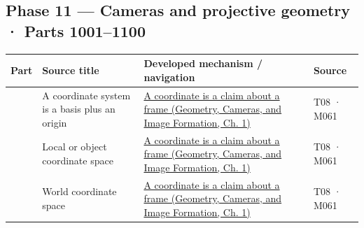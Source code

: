 \subsection{Phase 11 --- Cameras and projective geometry · Parts 1001--1100}\label{appendix-fd090d982a15-phase-11-cameras-and-projective-geometry-parts-10011100}

\hypertarget{appendix-fd090d982a15-phase-11-cameras-and-projective-geometry-parts-10011100}{}

{\def\LTcaptype{none} %
\begin{longtable}[]{@{}
  >{\raggedleft\arraybackslash}p{}
  >{\raggedright\arraybackslash}p{}
  >{\raggedright\arraybackslash}p{}
  >{\raggedright\arraybackslash}p{}@{}}
\toprule\noalign{}
\begin{minipage}[b]{\linewidth}\raggedleft
Part
\end{minipage} & \begin{minipage}[b]{\linewidth}\raggedright
Source title
\end{minipage} & \begin{minipage}[b]{\linewidth}\raggedright
Developed mechanism / navigation
\end{minipage} & \begin{minipage}[b]{\linewidth}\raggedright
Source
\end{minipage} \\
\midrule\noalign{}
\endhead
\bottomrule\noalign{}
\endlastfoot
1001 & A coordinate system is a basis plus an origin & \href{../03-Geometry-Cameras-and-Image-Formation/main.pdf\#nameddest=02-foundations-ii-ch032-a-coordinate-is-a-claim-about-a-frame}{A coordinate is a claim about a frame (Geometry, Cameras, and Image Formation, Ch. 1)} & T08 · M061 \\
1002 & Local or object coordinate space & \href{../03-Geometry-Cameras-and-Image-Formation/main.pdf\#nameddest=02-foundations-ii-ch032-a-coordinate-is-a-claim-about-a-frame}{A coordinate is a claim about a frame (Geometry, Cameras, and Image Formation, Ch. 1)} & T08 · M061 \\
1003 & World coordinate space & \href{../03-Geometry-Cameras-and-Image-Formation/main.pdf\#nameddest=02-foundations-ii-ch032-a-coordinate-is-a-claim-about-a-frame}{A coordinate is a claim about a frame (Geometry, Cameras, and Image Formation, Ch. 1)} & T08 · M061 \\

\end{longtable}}
